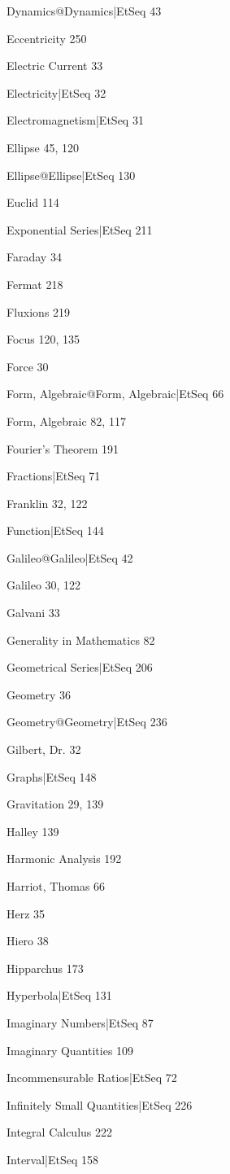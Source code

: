 \documentclass[12pt,leqno]{book}[2005/09/16]
\begin{document}
Dynamics@Dynamics|EtSeq 43

Eccentricity 250

Electric Current 33

Electricity|EtSeq 32

Electromagnetism|EtSeq 31

Ellipse 45, 120

Ellipse@Ellipse|EtSeq 130

Euclid 114

Exponential Series|EtSeq 211

Faraday 34

Fermat 218

Fluxions 219

Focus 120, 135

Force 30

Form, Algebraic@Form, Algebraic|EtSeq 66

Form, Algebraic 82, 117

Fourier's Theorem 191

Fractions|EtSeq 71

Franklin 32, 122

Function|EtSeq 144

Galileo@Galileo|EtSeq 42

Galileo 30, 122

Galvani 33

Generality in Mathematics 82

Geometrical Series|EtSeq 206

Geometry 36

Geometry@Geometry|EtSeq 236

Gilbert, Dr. 32

Graphs|EtSeq 148

Gravitation 29, 139

Halley 139

Harmonic Analysis 192

Harriot, Thomas 66

Herz 35

Hiero 38

Hipparchus 173

Hyperbola|EtSeq 131

Imaginary Numbers|EtSeq 87

Imaginary Quantities 109

Incommensurable Ratios|EtSeq 72

Infinitely Small Quantities|EtSeq 226

Integral Calculus 222

Interval|EtSeq 158
\end{document}
